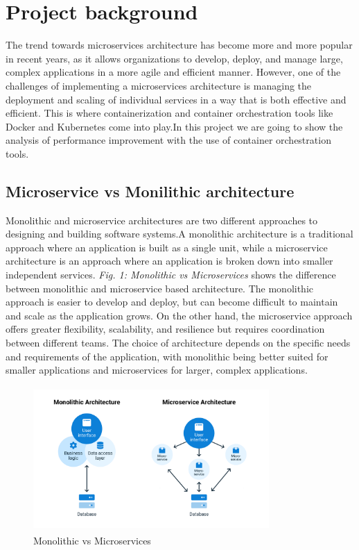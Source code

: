 \section{Project background}
The trend towards microservices architecture has become more and more popular in recent years, as it allows organizations to develop, deploy, and manage large, complex applications in a more agile and efficient manner. However, one of the challenges of implementing a microservices architecture is managing the deployment and scaling of individual services in a way that is both effective and efficient. This is where containerization and container orchestration tools like Docker and Kubernetes come into play.In this project we are going to show the analysis of performance improvement with the use of container orchestration tools.

\subsection{ Microservice vs Monilithic architecture}
Monolithic and microservice architectures are two different approaches to designing and building software systems.A monolithic architecture is a traditional approach where an application is built as a single unit, while a microservice architecture is an approach where an application is broken down into smaller independent services. \emph{Fig. 1: Monolithic vs Microservices} shows the difference between monolithic and microservice based architecture. The monolithic approach is easier to develop and deploy, but can become difficult to maintain and scale as the application grows. On the other hand, the microservice approach offers greater flexibility, scalability, and resilience but requires coordination between different teams. The choice of architecture depends on the specific needs and requirements of the application, with monolithic being better suited for smaller applications and microservices for larger, complex applications.

\begin{figure}
\centering
\includegraphics[width=9cm, height=5.5cm]{monolith-vs-microservices}
\caption{Monolithic vs Microservices}
\end{figure}


